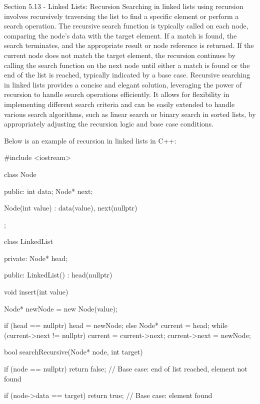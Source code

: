 \begin{notes}{Section 5.13 - Linked Lists: Recursion}
    Searching in linked lists using recursion involves recursively traversing the list to find a specific element or perform a search operation. The recursive search function is typically called on each node, comparing the node's data with the target element. If a match is found, the search terminates, and the appropriate result or node reference is returned. If the current 
    node does not match the target element, the recursion continues by calling the search function on the next node until either a match is found or the end of the list is reached, typically indicated by a base case. Recursive searching in linked lists provides a concise and elegant solution, leveraging the power of recursion to handle search operations efficiently. It allows 
    for flexibility in implementing different search criteria and can be easily extended to handle various search algorithms, such as linear search or binary search in sorted lists, by appropriately adjusting the recursion logic and base case conditions.
    
    \begin{highlight}
        Below is an example of recursion in linked lists in C++:
    
    \begin{code}[C++]
    #include <iostream>
    
    class Node {
    public:
        int data;
        Node* next;
    
        Node(int value) : data(value), next(nullptr) {}
    };
    
    class LinkedList {
    private:
        Node* head;
    
    public:
        LinkedList() : head(nullptr) {}
    
        void insert(int value) {
            Node* newNode = new Node(value);
    
            if (head == nullptr) {
                head = newNode;
            } else {
                Node* current = head;
                while (current->next != nullptr) {
                    current = current->next;
                }
                current->next = newNode;
            }
        }
    
        bool searchRecursive(Node* node, int target) {
            if (node == nullptr) {
                return false;  // Base case: end of list reached, element not found
            }
    
            if (node->data == target) {
                return true;  // Base case: element found
            }
    
}}
\end{code}
\end{highlight}
\end{notes}
